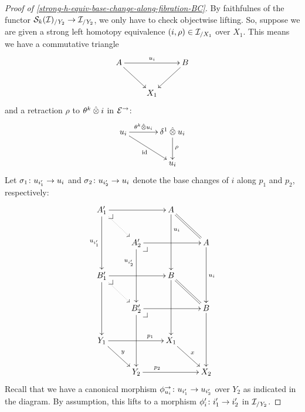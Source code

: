 \documentclass[reqno,10pt,a4paper,oneside,draft]{amsart}
\begin{document}
\begin{proof}[Proof of \cref{strong-h-equiv-base-change-along-fibration-BC}]
By faithfulnes of the functor $\cal{S}_k(\cal{I})_{/Y_2} \to \cal{I}_{/Y_2}$, we only have to check objectwise lifting.
So, suppose we are given a strong left homotopy equivalence $(i, \rho) \in \cal{I}_{/X_1}$ over $X_1$.
This means we have a commutative triangle
\[
\xymatrix{
  A
  \ar[rr]^{u_i}
  \ar[dr]
&&
  B
  \ar[dl]
\\&
  X_1
}
\]
and a retraction $\rho$ to $\thetak \hatotimes i$ in $\catE^\to$:
\[
\xymatrix@C+1em{
  u_i
  \ar[r]^-{\thetak \hatotimes u_i}
  \ar[dr]_{\id}
&
  \rcyl \hatotimes u_i \ar[d]^{\rho}
\\&
  u_i
}
\]
Let $\sigma_1 \co u_{i_1'} \to u_i$ and $\sigma_2 \co u_{i_2'} \to u_i$ denote the base changes of $i$ along $p_1$ and $p_2$, respectively:
\[
\xymatrix{
  A_1'
  \ar[rr]
  \ar[dd]_{u_{i_1'}}
  \pullback{dr}
  \ar@{.>}[dr]
&&
  A
  \ar[dd]^(0.3){u_i}
  \ar@{=}[dr]
\\&
  A_2'
  \ar[rr]
  \ar[dd]_(0.3){u_{i_2'}}
  \pullback{dr}
&&
  A
  \ar[dd]^{u_i}
\\
  B_1'
  \ar[rr]
  \ar[dd]
  \pullback{dr}
  \ar@{.>}[dr]
&&
  B
  \ar[dd]
  \ar@{=}[dr]
\\&
  B_2'
  \ar[rr]
  \ar[dd]
  \pullback{dr}
&&
  B
  \ar[dd]
\\
  Y_1
  \ar[rr]^(0.7){p_1}
  \ar[dr]^{y}
&&
  X_1
  \ar[dr]^{x}
\\&
  Y_2
  \ar[rr]^(0.3){p_2}
&&
  X_2
}
\]
Recall that we have a canonical morphism $\phi_{u_i}^\to \co u_{i_1'} \to u_{i_2'}$ over $Y_2$ as indicated in the diagram.
By assumption, this lifts to a morphism $\phi_i' \co i_1' \to i_2'$ in $\cal{I}_{/Y_2}$.


\end{proof}
\end{document}

